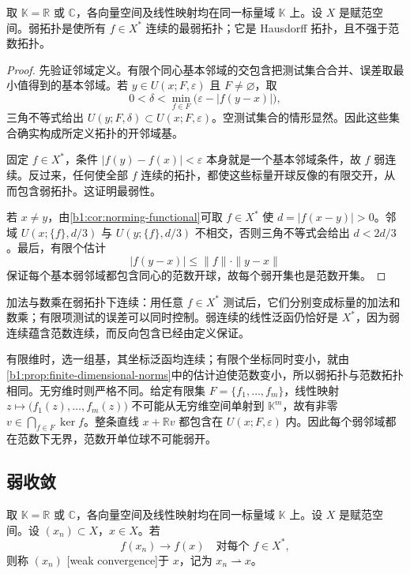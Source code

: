 \begin{proposition}\label{b1:prop:weak-topology-properties}
取 \(\mathbb K=\mathbb R\) 或 \(\mathbb C\)，各向量空间及线性映射均在同一标量域 \(\mathbb K\) 上。设 \(X\) 是赋范空间。弱拓扑是使所有 \(f\in X^*\) 连续的最弱拓扑；它是 Hausdorff 拓扑，且不强于范数拓扑。
\end{proposition}
\begin{proof}
先验证邻域定义。有限个同心基本邻域的交包含把测试集合合并、误差取最小值得到的基本邻域。若 \(y\in U(x;F,\varepsilon)\) 且 \(F\ne\varnothing\)，取
\[
 0<\delta<\min_{f\in F}\bigl(\varepsilon-|f(y-x)|\bigr),
\]
三角不等式给出 \(U(y;F,\delta)\subset U(x;F,\varepsilon)\)。空测试集合的情形显然。因此这些集合确实构成所定义拓扑的开邻域基。

固定 \(f\in X^*\)，条件 \(|f(y)-f(x)|<\varepsilon\) 本身就是一个基本邻域条件，故 \(f\) 弱连续。反过来，任何使全部 \(f\) 连续的拓扑，都使这些标量开球反像的有限交开，从而包含弱拓扑。这证明最弱性。

若 \(x\ne y\)，由\cref{b1:cor:norming-functional}可取 \(f\in X^*\) 使 \(d=|f(x-y)|>0\)。邻域 \(U(x;\{f\},d/3)\) 与 \(U(y;\{f\},d/3)\) 不相交，否则三角不等式会给出 \(d<2d/3\)。最后，有限个估计
\[
 |f(y-x)|\leq\|f\|\cdot\|y-x\|
\]
保证每个基本弱邻域都包含同心的范数开球，故每个弱开集也是范数开集。
\end{proof}

加法与数乘在弱拓扑下连续：用任意 \(f\in X^*\) 测试后，它们分别变成标量的加法和数乘；有限项测试的误差可以同时控制。弱连续的线性泛函仍恰好是 \(X^*\)，因为弱连续蕴含范数连续，而反向包含已经由定义保证。

\ProseParagraphBreak

有限维时，选一组基，其坐标泛函均连续；有限个坐标同时变小，就由\cref{b1:prop:finite-dimensional-norms}中的估计迫使范数变小，所以弱拓扑与范数拓扑相同。无穷维时则严格不同。给定有限集 \(F=\{f_1,\ldots,f_m\}\)，线性映射 \(z\mapsto\bigl(f_1(z),\ldots,f_m(z)\bigr)\) 不可能从无穷维空间单射到 \(\mathbb K^m\)，故有非零 \(v\in\bigcap_{f\in F}\ker f\)。整条直线 \(x+\mathbb Rv\) 都包含在 \(U(x;F,\varepsilon)\) 内。因此每个弱邻域都在范数下无界，范数开单位球不可能弱开。

\subsection{弱收敛}
\label{b1:subsec:090102}

\begin{definition}\label{b1:def:weak-convergence}
取 \(\mathbb K=\mathbb R\) 或 \(\mathbb C\)，各向量空间及线性映射均在同一标量域 \(\mathbb K\) 上。设 \(X\) 是赋范空间。设 \((x_n)\subset X\)，\(x\in X\)。若
\[
 f(x_n)\longrightarrow f(x)\quad\text{对每个 }f\in X^*,
\]
则称 \((x_n)\) [weak convergence]于 \(x\)，记为 \(x_n\rightharpoonup x\)。
\end{definition}

